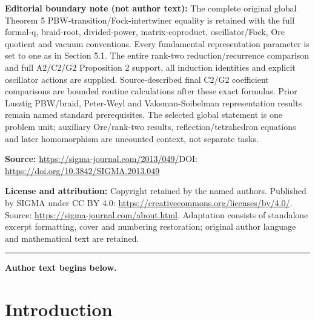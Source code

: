 \documentclass[11pt]{article}
\begin{document}
\noindent\textbf{Editorial boundary note (not author text):} The complete original global Theorem 5 PBW-transition/Fock-intertwiner equality is retained with the full formal-q, braid-root, divided-power, matrix-coproduct, oscillator/Fock, Ore quotient and vacuum conventions. Every fundamental representation parameter is set to one as in Section 5.1. The entire rank-two reduction/recurrence comparison and full A2/C2/G2 Proposition 2 support, all induction identities and explicit oscillator actions are supplied. Source-described final C2/G2 coefficient comparisons are bounded routine calculations after these exact formulas. Prior Lusztig PBW/braid, Peter-Weyl and Vaksman-Soibelman representation results remain named standard prerequisites. The selected global statement is one problem unit; auxiliary Ore/rank-two results, reflection/tetrahedron equations and later homomorphism are uncounted context, not separate tasks.\par
\noindent\textbf{Source:} \url{https://sigma-journal.com/2013/049/}\quad DOI: \url{https://doi.org/10.3842/SIGMA.2013.049}\par
\noindent\textbf{License and attribution:} Copyright retained by the named authors. Published by SIGMA under CC BY 4.0: \url{https://creativecommons.org/licenses/by/4.0/}. Source: \url{https://sigma-journal.com/about.html}. Adaptation consists of standalone excerpt formatting, cover and numbering restoration; original author language and mathematical text are retained.\par
\medskip\hrule\medskip\noindent\textbf{Author text begins below.}\par
\setcounter{section}{0}
\setcounter{subsection}{0}
\setcounter{subsubsection}{0}
\setcounter{equation}{0}
\section{Introduction}\label{a:sec1}
\end{document}
